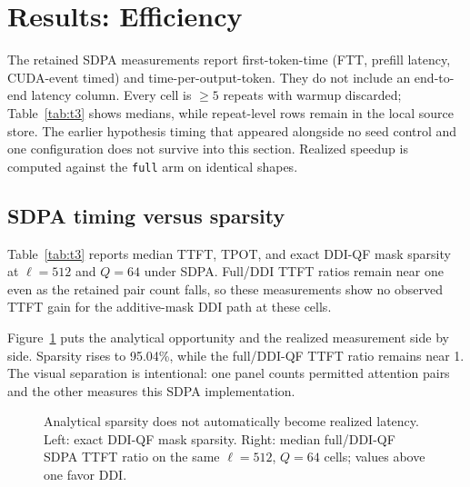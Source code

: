 \section{Results: Efficiency}
\label{sec:results-efficiency}

The retained SDPA measurements report first-token-time (FTT, prefill latency,
CUDA-event timed) and time-per-output-token. They do not include an end-to-end
latency column.
Every cell is $\geq 5$ repeats with warmup discarded; Table~\ref{tab:t3}
shows medians, while repeat-level rows remain in the local source store.
The earlier hypothesis timing that appeared alongside no seed control and
one configuration does not survive into this section. Realized speedup is
computed against the \texttt{full} arm on identical shapes.

\subsection{SDPA timing versus sparsity}
\label{sec:results-efficiency-analytical}

Table~\ref{tab:t3} reports median TTFT, TPOT, and exact DDI-QF mask sparsity at
$\ell=512$ and $Q=64$ under SDPA. Full/DDI TTFT ratios remain near one even as
the retained pair count falls, so these measurements show no observed TTFT gain
for the additive-mask DDI path at these cells.

Figure~\ref{fig:efficiency-intuition} puts the analytical opportunity and the
realized measurement side by side. Sparsity rises to 95.04\%, while the
full/DDI-QF TTFT ratio remains near 1. The visual separation is intentional:
one panel counts permitted attention pairs and the other measures this SDPA
implementation.

\begin{figure}[t]
\centering

\caption{Analytical sparsity does not automatically become realized latency.
    Left: exact DDI-QF mask sparsity. Right: median full/DDI-QF SDPA TTFT ratio
    on the same $\ell=512$, $Q=64$ cells; values above one favor DDI.}
\label{fig:efficiency-intuition}
\end{figure}

